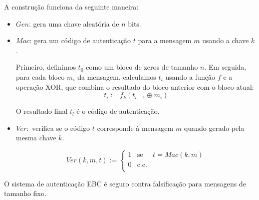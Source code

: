 A construção funciona da seguinte maneira:
\begin{itemize}
\item[] $Gen$: gera uma chave aleatória de $n$ bits.
\item[] $Mac$: gera um código de autenticação $t$ para a mensagem $m$ usando a chave $k$.

Primeiro, definimos $t_0$ como um bloco de zeros de tamanho $n$.
Em seguida, para cada bloco $m_i$ da mensagem, calculamos $t_i$ usando a função $f$ e a operação XOR, que combina o resultado do bloco anterior com o bloco atual:
\begin{displaymath}
t_i := f_k(t_{i-1} \oplus m_i)
\end{displaymath}

O resultado final $t_l$ é o código de autenticação.

\item[] $Ver:$ verifica se o código $t$ corresponde à mensagem $m$ quando gerado pela mesma chave $k$.

\begin{displaymath}
  Ver(k, m, t) :=  \left\{
  \begin{array}{lcl}
    1 & \textrm{se} & t = Mac(k,m)\\
    0 & \textrm{c.c.} &\\
  \end{array}
  \right.
\end{displaymath}
\end{itemize}

\begin{center}
\end{center}


\begin{theorem}
  O sistema de autenticação EBC é seguro contra falsificação para mensagens de tamanho fixo.
\end{theorem}

